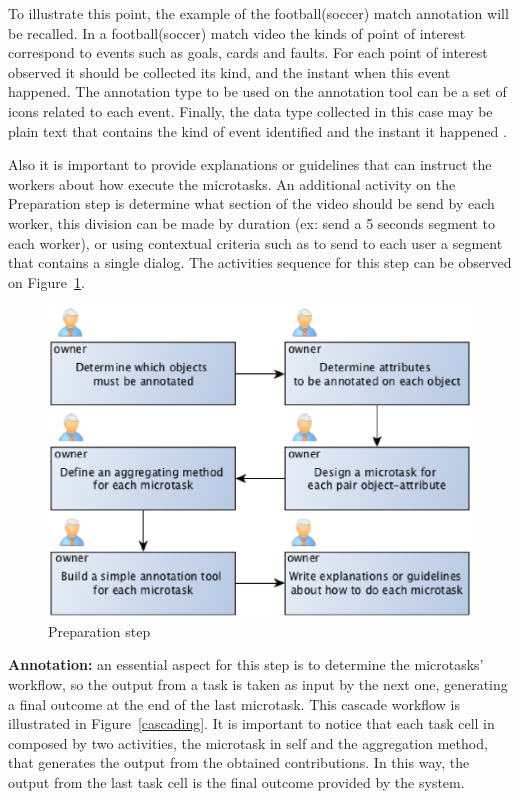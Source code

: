 To illustrate this point, the example of the football(soccer) match annotation will be recalled. In a football(soccer) match video the kinds of point of interest correspond to events such as goals, cards and faults. For each point of interest observed it should be collected its kind, and the instant when this event happened. The annotation type to be used on the annotation tool can be a set of icons related to each event. Finally, the data type collected in this case may be plain text that contains the kind of event identified and the instant it happened \cite{santos2007estrategia}.

Also it is important to provide explanations or guidelines that can instruct the workers about how execute the microtasks. An additional activity on the Preparation step is determine what section of the video should be send by each worker, this division can be made by duration (ex: send a 5 seconds segment to each worker), or using contextual criteria such as to send to each user a segment that contains a single dialog. The activities sequence for this step can be observed on Figure~\ref{preparation}.

\begin{figure}[h]
	\centerline{\includegraphics[scale=0.4] {figure/preparation}}
	\caption{Preparation step}
	\label{preparation}
\end{figure}


\textbf{Annotation:} an essential aspect for this step is to determine the microtasks' workflow, so the output from a task is taken as input by the next one, generating a final outcome at the end of the last microtask. This cascade workflow is illustrated in Figure~\ref{cascading}. It is important to notice that each task cell in composed by two activities, the microtask in self and the aggregation method, that generates the output from the obtained contributions. In this way, the output from the last task cell is the final outcome provided by the system.

